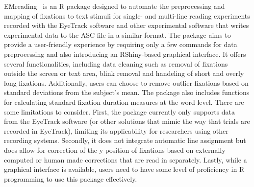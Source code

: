 \documentclass[twocolumn]{article}
\begin{document}
EMreading~\cite{vasilevMartinvasilevEMreading2023} is an R package designed to automate the preprocessing and mapping of fixations to text stimuli for single- and multi-line reading experiments recorded with the EyeTrack software and other experimental software that writes experimental data to the ASC file in a similar format. The package aims to provide a user-friendly experience by requiring only a few commands for data preprocessing and also introducing an RShiny-based graphical interface. It offers several functionalities, including data cleaning such as removal of fixations outside the screen or text area, blink removal and handeling of short and overly long fixations. Additionally, users can choose to remove outlier fixations based on standard deviations from the subject's mean. The package also includes functions for calculating standard fixation duration measures at the word level. There are some limitations to consider. First, the package currently only supports data from the EyeTrack software (or other solutions that mimic the way that trials are recorded in EyeTrack), limiting its applicability for researchers using other recording systems. Secondly, it does not integrate automatic line assignment but does allow for correction of the y-position of fixations based on externally computed or human made corrections that are read in separately. Lastly, while a graphical interface is available, users need to have some level of proficiency in R programming to use this package effectively.
\end{document}
